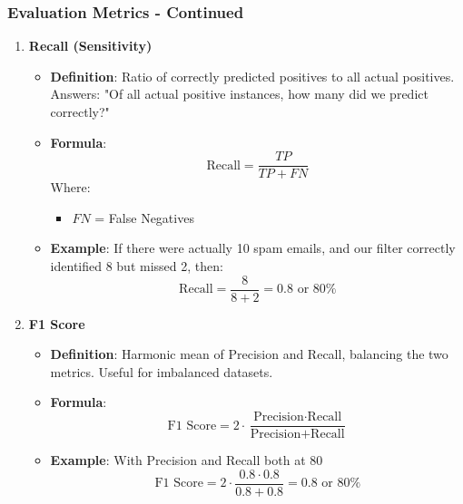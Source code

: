 \documentclass{beamer}
\begin{document}
\begin{frame}[fragile]
    \frametitle{Evaluation Metrics - Continued}
    \begin{enumerate}[resume]
        \item \textbf{Recall (Sensitivity)}
            \begin{itemize}
                \item \textbf{Definition}: Ratio of correctly predicted positives to all actual positives. Answers: "Of all actual positive instances, how many did we predict correctly?"
                \item \textbf{Formula}:
                \begin{equation}
                    \text{Recall} = \frac{TP}{TP + FN}
                \end{equation}
                Where:
                \begin{itemize}
                    \item \(FN\) = False Negatives
                \end{itemize}
                \item \textbf{Example}: If there were actually 10 spam emails, and our filter correctly identified 8 but missed 2, then:
                \begin{equation}
                    \text{Recall} = \frac{8}{8 + 2} = 0.8 \text{ or } 80\%
                \end{equation}
        \end{itemize}

        \item \textbf{F1 Score}
            \begin{itemize}
                \item \textbf{Definition}: Harmonic mean of Precision and Recall, balancing the two metrics. Useful for imbalanced datasets.
                \item \textbf{Formula}:
                \begin{equation}
                    \text{F1 Score} = 2 \cdot \frac{\text{Precision} \cdot \text{Recall}}{\text{Precision} + \text{Recall}}
                \end{equation}
                \item \textbf{Example}: With Precision and Recall both at 80%
                \begin{equation}
                    \text{F1 Score} = 2 \cdot \frac{0.8 \cdot 0.8}{0.8 + 0.8} = 0.8 \text{ or } 80\%
                \end{equation}
            \end{itemize}
    \end{enumerate}
\end{frame}
\end{document}
